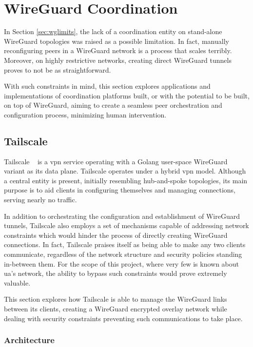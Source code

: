 \documentclass[11pt,twoside,a4paper]{report}
\begin{document}
\section{WireGuard Coordination}
\label{sec:coordination}

In Section \ref{sec:wglimits}, the lack of a coordination entity on stand-alone WireGuard topologies was raised as a possible limitation. In fact, manually reconfiguring peers in a WireGuard network is a process that scales terribly. Moreover, on highly restrictive networks, creating direct WireGuard tunnels proves to not be as straightforward.

With such constraints in mind, this section explores applications and implementations of coordination platforms built, or with the potential to be built, on top of WireGuard, aiming to create a seamless peer orchestration and configuration process, minimizing human intervention.

\subsection{Tailscale}

Tailscale ~\cite{tailscale2020online} is a \ac{vpn} service operating with a Golang user-space WireGuard variant as its data plane. Tailscale operates under a hybrid \ac{vpn} model. Although a central entity is present, initially resembling hub-and-spoke topologies, its main purpose is to aid clients in configuring themselves and managing connections, serving nearly no traffic.

In addition to orchestrating the configuration and establishment of WireGuard tunnels, Tailscale also employs a set of mechanisms capable of addressing network constraints which would hinder the process of directly creating WireGuard connections. In fact, Tailscale praises itself as being able to make any two clients communicate, regardless of the network structure and security policies standing in-between them. For the scope of this project, where very few is known about \ac{ua}'s network, the ability to bypass such constraints would prove extremely valuable.

This section explores how Tailscale is able to manage the WireGuard links between its clients, creating a WireGuard encrypted overlay network while dealing with security constraints preventing such communications to take place.

\subsubsection{Architecture}
\end{document}
